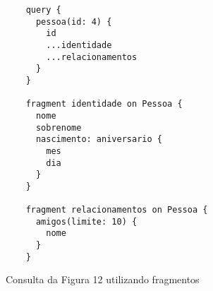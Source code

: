 \begin{figure}[H]
  \centering
  \begin{verbatim}
    query {
      pessoa(id: 4) {
        id
        ...identidade
        ...relacionamentos
      }
    }

    fragment identidade on Pessoa {
      nome
      sobrenome
      nascimento: aniversario {
        mes
        dia
      }
    }

    fragment relacionamentos on Pessoa {
      amigos(limite: 10) {
        nome
      }
    }
  \end{verbatim}
  \caption{Consulta da Figura 12 utilizando fragmentos}
\end{figure}
